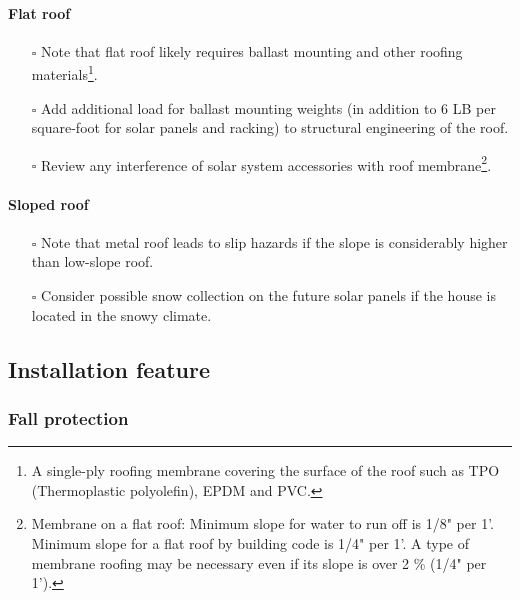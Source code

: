 \documentclass[]{article}
\providecommand{\tightlist}{%
  \setlength{\itemsep}{0pt}\setlength{\parskip}{0pt}}
\let\oldparagraph\paragraph
\renewcommand{\paragraph}[1]{\oldparagraph{#1}\mbox{}}
\let\rmarkdownfootnote\footnote%
\def\footnote{\protect\rmarkdownfootnote}
\begin{document}
\hypertarget{flat-roof}{%
\paragraph{Flat roof}\label{flat-roof}}

\begin{itemize}
\tightlist
\item[$\square$]
  Note that flat roof likely requires ballast mounting and other roofing
  materials\footnote{A single-ply roofing membrane covering the surface
    of the roof such as TPO (Thermoplastic polyolefin), EPDM and PVC.}.
\item[$\square$]
  Add additional load for ballast mounting weights (in addition to 6 LB
  per square-foot for solar panels and racking) to structural
  engineering of the roof.
\item[$\square$]
  Review any interference of solar system accessories with roof
  membrane\footnote{Membrane on a flat roof: Minimum slope for water to
    run off is 1/8" per 1'. Minimum slope for a flat roof by building
    code is 1/4" per 1'. A type of membrane roofing may be necessary
    even if its slope is over 2 \% (1/4" per 1').}.
\end{itemize}

\hypertarget{sloped-roof}{%
\paragraph{Sloped roof}\label{sloped-roof}}

\begin{itemize}
\tightlist
\item[$\square$]
  Note that metal roof leads to slip hazards if the slope is
  considerably higher than low-slope roof.
\item[$\square$]
  Consider possible snow collection on the future solar panels if the
  house is located in the snowy climate.
\end{itemize}

\hypertarget{installation-feature}{%
\subsection{Installation feature}\label{installation-feature}}

\hypertarget{fall-protection}{%
\subsubsection{Fall protection}\label{fall-protection}}
\end{document}

